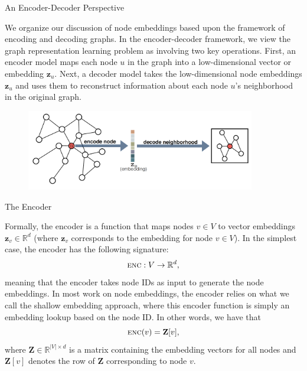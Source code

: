 \documentclass[10pt, aspectratio=169, compress, protectframetitle, handout]{beamer}
\begin{document}
\begin{frame}{An Encoder-Decoder Perspective}

    We organize our discussion of node embeddings based upon the framework of \alert{encoding and decoding graphs}. In the encoder-decoder framework, we view the graph representation learning problem as involving two key operations. First, an \alert{encoder} model maps each node $u$ in the graph into a low-dimensional vector or embedding $\mathbf z_u$. Next, a \alert{decoder} model takes the low-dimensional node embeddings $\mathbf z_u$ and uses them to reconstruct information about each node $u$'s neighborhood in the original graph.

    \begin{figure}[ht]
        \centering
        \includegraphics[width=10cm]{figures/Encoder_decoder.png}
        \label{fig:enc-dec}
    \end{figure}
    
\end{frame}


\begin{frame}{The Encoder}

    Formally, the \alert{encoder} is a function that maps nodes $v \in V$ to vector embeddings $\mathbf z_v \in \mathbb R^d$ (where $\mathbf z_v$ corresponds to the embedding for node $v \in V$). In the simplest case, the encoder has the following signature:
    \begin{equation}
        \textsc{enc}: V \rightarrow \mathbb R^d,
    \end{equation}
    meaning that the encoder takes node IDs as input to generate the node embeddings. In most work on node embeddings, the encoder relies on what we call the \alert{shallow embedding} approach, where this encoder function is simply an embedding lookup based on the node ID. In other words, we have that
    \begin{equation}
        \textsc{enc}(v) = \mathbf Z[v],
        \label{eq:shallowemb}
    \end{equation}
    where $\mathbf Z \in \mathbb R^{|V| \times d}$ is a matrix containing the embedding vectors for all nodes and $\mathbf Z[v]$ denotes the row of $\mathbf Z$ corresponding to node $v$.
    
\end{frame}
\end{document}
